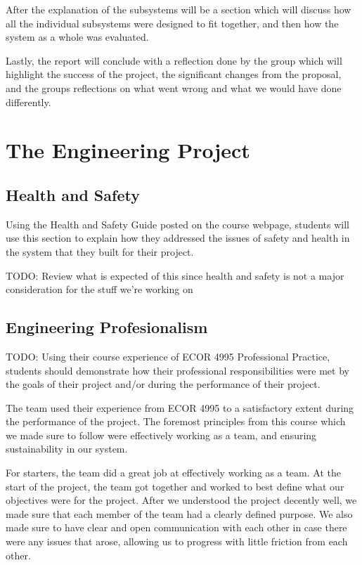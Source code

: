 \documentclass[titlepage]{article}
\begin{document}
After the explanation of the subsystems will be a section which will discuss how all the individual subsystems were designed to fit together, and then how the system as a whole was evaluated.

Lastly, the report will conclude with a reflection done by the group which will highlight the success of the project, the significant changes from the proposal, and the groups reflections on what went wrong and what we would have done differently.

\section{The Engineering Project}

\subsection{Health and Safety}
Using the Health and Safety Guide posted on the course webpage, students will use this section to explain how they addressed the issues of safety and health in the system that they built for their project.

TODO: Review what is expected of this since health and safety is not a major consideration for the stuff we're working on

\subsection{Engineering Profesionalism}
TODO: Using their course experience of ECOR 4995 Professional Practice, students should demonstrate how their professional responsibilities were met by the goals of their project and/or during the performance of their project.

The team used their experience from ECOR 4995 to a satisfactory extent during the performance of the project. The foremost principles from this course which we made sure to follow were effectively working as a team, and ensuring sustainability in our system. 

For starters, the team did a great job at effectively working as a team. At the start of the project, the team got together and worked to best define what our objectives were for the project. After we understood the project decently well, we made sure that each member of the team had a clearly defined purpose. We also made sure to have clear and open communication with each other in case there were any issues that arose, allowing us to progress with little friction from each other.
\end{document}
